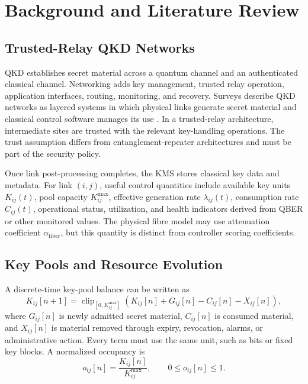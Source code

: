 \chapter{Background and Literature Review}
\label{chap:background}


\section{Trusted-Relay QKD Networks}

QKD establishes secret material across a quantum channel and an authenticated
classical channel. Networking adds key management, trusted relay operation,
application interfaces, routing, monitoring, and recovery. Surveys describe QKD
networks as layered systems in which physical links generate secret material and
classical control software manages its use
\cite{cao2022qinternet,mehic2020networking}. In a trusted-relay architecture,
intermediate sites are trusted with the relevant key-handling operations. The trust
assumption differs from entanglement-repeater architectures and must be part of the
security policy.

Once link post-processing completes, the KMS stores classical key data and metadata.
For link $(i,j)$, useful control quantities include available key units
$K_{ij}(t)$, pool capacity $K_{ij}^{\max}$, effective generation rate
$\lambda_{ij}(t)$, consumption rate $C_{ij}(t)$, operational status, utilization,
and health indicators derived from QBER or other monitored values. The physical
fibre model may use attenuation coefficient $\alpha_{\mathrm{fiber}}$, but this
quantity is distinct from controller scoring coefficients.

\section{Key Pools and Resource Evolution}

A discrete-time key-pool balance can be written as
\begin{equation}
K_{ij}[n+1]
=\operatorname{clip}_{[0,K_{ij}^{\max}]}
\left(K_{ij}[n]+G_{ij}[n]-C_{ij}[n]-X_{ij}[n]\right),
\label{eq:key-pool-balance}
\end{equation}
where $G_{ij}[n]$ is newly admitted secret material, $C_{ij}[n]$ is consumed
material, and $X_{ij}[n]$ is material removed through expiry, revocation, alarms,
or administrative action. Every term must use the same unit, such as bits or fixed
key blocks. A normalized occupancy is
\begin{equation}
o_{ij}[n]=\frac{K_{ij}[n]}{K_{ij}^{\max}},
\qquad 0\leq o_{ij}[n]\leq1.
\label{eq:occupancy}
\end{equation}

